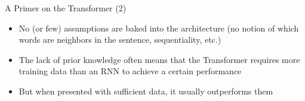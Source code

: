 
\begin{vbframe}{A Primer on the Transformer (2)}

\vfill

\begin{itemize}
	\item No (or few) assumptions are baked into the architecture (no notion of which words are neighbors in the sentence, sequentiality, etc.)
	\item The lack of prior knowledge often means that the Transformer requires more training data than an RNN to achieve a certain performance
	\item But when presented with sufficient data, it usually outperforms them
\end{itemize}

\vfill

\end{vbframe}


\endlecture




